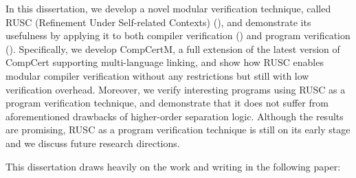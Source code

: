 In this dissertation, we develop a novel modular verification technique, called RUSC (Refinement
Under Self-related Contexts) (), and demonstrate its usefulness by applying it to
both compiler verification () and program verification ().
Specifically, we develop CompCertM, a full
extension of the latest version of CompCert supporting multi-language
linking, and show how RUSC enables modular compiler verification without any restrictions but still with low verification overhead.
Moreover, we verify interesting programs using RUSC as a program verification technique, and demonstrate that it does not suffer from aforementioned drawbacks of higher-order separation logic.
Although the results are promising, RUSC as a program verification technique is still on its early stage and we discuss future research directions.


This dissertation draws heavily on the work and writing in the following paper: \cite{song:compcertm}


